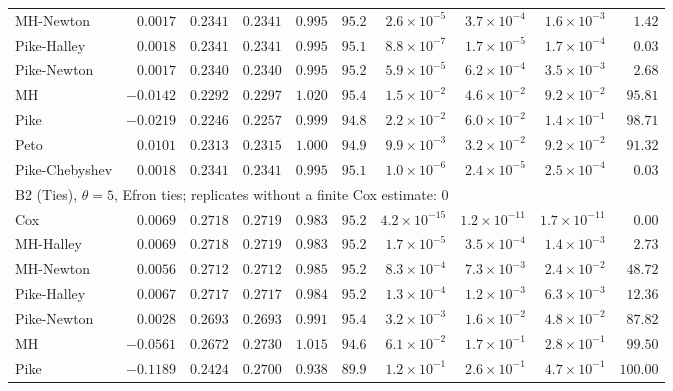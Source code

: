 \begin{landscape}
\begin{longtable}{lrrrrrrrrr}
MH-Newton & $0.0017$ & $0.2341$ & $0.2341$ & $0.995$ & $95.2$ & $2.6 \times 10^{-5}$ & $3.7 \times 10^{-4}$ & $1.6 \times 10^{-3}$ & $1.42$ \\
Pike-Halley & $0.0018$ & $0.2341$ & $0.2341$ & $0.995$ & $95.1$ & $8.8 \times 10^{-7}$ & $1.7 \times 10^{-5}$ & $1.7 \times 10^{-4}$ & $0.03$ \\
Pike-Newton & $0.0017$ & $0.2340$ & $0.2340$ & $0.995$ & $95.2$ & $5.9 \times 10^{-5}$ & $6.2 \times 10^{-4}$ & $3.5 \times 10^{-3}$ & $2.68$ \\
MH & $-0.0142$ & $0.2292$ & $0.2297$ & $1.020$ & $95.4$ & $1.5 \times 10^{-2}$ & $4.6 \times 10^{-2}$ & $9.2 \times 10^{-2}$ & $95.81$ \\
Pike & $-0.0219$ & $0.2246$ & $0.2257$ & $0.999$ & $94.8$ & $2.2 \times 10^{-2}$ & $6.0 \times 10^{-2}$ & $1.4 \times 10^{-1}$ & $98.71$ \\
Peto & $0.0101$ & $0.2313$ & $0.2315$ & $1.000$ & $94.9$ & $9.9 \times 10^{-3}$ & $3.2 \times 10^{-2}$ & $9.2 \times 10^{-2}$ & $91.32$ \\
Pike-Chebyshev & $0.0018$ & $0.2341$ & $0.2341$ & $0.995$ & $95.1$ & $1.0 \times 10^{-6}$ & $2.4 \times 10^{-5}$ & $2.5 \times 10^{-4}$ & $0.03$ \\
\multicolumn{10}{l}{B2 (Ties), $\theta = 5$, Efron ties; replicates without a finite Cox estimate: 0} \\
Cox & $0.0069$ & $0.2718$ & $0.2719$ & $0.983$ & $95.2$ & $4.2 \times 10^{-15}$ & $1.2 \times 10^{-11}$ & $1.7 \times 10^{-11}$ & $0.00$ \\
MH-Halley & $0.0069$ & $0.2718$ & $0.2719$ & $0.983$ & $95.2$ & $1.7 \times 10^{-5}$ & $3.5 \times 10^{-4}$ & $1.4 \times 10^{-3}$ & $2.73$ \\
MH-Newton & $0.0056$ & $0.2712$ & $0.2712$ & $0.985$ & $95.2$ & $8.3 \times 10^{-4}$ & $7.3 \times 10^{-3}$ & $2.4 \times 10^{-2}$ & $48.72$ \\
Pike-Halley & $0.0067$ & $0.2717$ & $0.2717$ & $0.984$ & $95.2$ & $1.3 \times 10^{-4}$ & $1.2 \times 10^{-3}$ & $6.3 \times 10^{-3}$ & $12.36$ \\
Pike-Newton & $0.0028$ & $0.2693$ & $0.2693$ & $0.991$ & $95.4$ & $3.2 \times 10^{-3}$ & $1.6 \times 10^{-2}$ & $4.8 \times 10^{-2}$ & $87.82$ \\
MH & $-0.0561$ & $0.2672$ & $0.2730$ & $1.015$ & $94.6$ & $6.1 \times 10^{-2}$ & $1.7 \times 10^{-1}$ & $2.8 \times 10^{-1}$ & $99.50$ \\
Pike & $-0.1189$ & $0.2424$ & $0.2700$ & $0.938$ & $89.9$ & $1.2 \times 10^{-1}$ & $2.6 \times 10^{-1}$ & $4.7 \times 10^{-1}$ & $100.00$ \\

\end{longtable}
\end{landscape}

